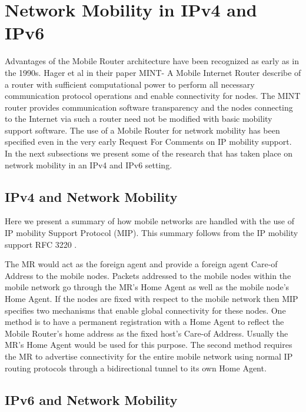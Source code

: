 \section{Network Mobility in IPv4 and IPv6}

Advantages of the Mobile Router architecture have been recognized as early as
in the 1990s. Hager et al \cite{10} in their paper MINT- A Mobile Internet
Router describe of a router with sufficient computational power to perform all
necessary communication protocol operations and enable connectivity for nodes.
The MINT router provides communication software transparency and the nodes
connecting to the Internet via such a router need not be modified with basic
mobility support software. The use of a Mobile Router for network mobility has
been specified even in the very early Request For Comments \cite{11} on IP
mobility support. In the next subsections we present some of the research that
has taken place on network mobility in an IPv4 and IPv6 setting.

\subsection{IPv4 and Network Mobility}

Here we present a summary of how mobile networks are handled with the use of
IP mobility Support Protocol (MIP). This summary follows from the IP mobility
support RFC 3220 \cite{9}.

The MR would act as the foreign agent and provide a foreign agent Care-of
Address to the mobile nodes. Packets addressed to the mobile nodes within the
mobile network go through the MR's Home Agent as well as the mobile node's
Home Agent. If the nodes are fixed with respect to the mobile network then MIP
specifies two mechanisms that enable global connectivity for these nodes. One
method is to have a permanent registration with a Home Agent to reflect the
Mobile Router's home address as the fixed host's Care-of Address. Usually the
MR's Home Agent would be used for this purpose. The second method requires the
MR to advertise connectivity for the entire mobile network using normal IP
routing protocols through a bidirectional tunnel to its own Home Agent.

\subsection{IPv6 and Network Mobility}

